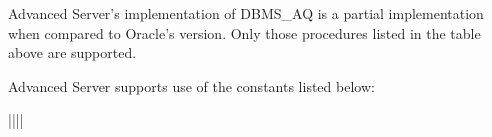 \documentclass[letterpaper,10pt,english,openany,oneside]{sphinxmanual}
\begin{document}
Advanced Server’s implementation of DBMS\_AQ is a partial implementation
when compared to Oracle’s version. Only those procedures listed in the
table above are supported.

Advanced Server supports use of the constants listed below:


\begin{savenotes}\sphinxatlongtablestart\begin{longtable}{||||}
\hline

\endfirsthead

%
{}\\
\hline

\endhead

\hline
{}\\
\endfoot

\endlastfoot


\end{longtable}
\end{savenotes}
\end{document}
